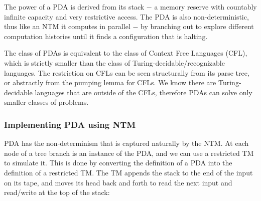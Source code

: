 \documentclass[12pt]{article}  %
\begin{document}
The power of a PDA is derived from its stack $-$ a memory reserve with countably infinite capacity and very restrictive access. The PDA is also non-deterministic, thus like an NTM it computes in parallel $-$ by branching out to explore different computation histories until it finds a configuration that is halting.

The class of PDAs is equivalent to the class of Context Free Languages (CFL), which is strictly smaller than the class of Turing-decidable/recognizable languages. The restriction on CFLs can be seen structurally from its parse tree, or abstractly from the pumping lemma for CFLs. We know there are Turing-decidable languages that are outside of the CFLs, therefore PDAs can solve only smaller classes of problems. 




\subsubsection{Implementing PDA using NTM}
PDA has the non-determinism that is captured naturally by the NTM. At each node of a tree branch is an instance of the PDA, and we can use a restricted TM to simulate it. This is done by converting the definition of a PDA into the definition of a restricted TM. The TM appends the stack to the end of the input on its tape, and moves its head back and forth to read the next input and read/write at the top of the stack:
\end{document}
